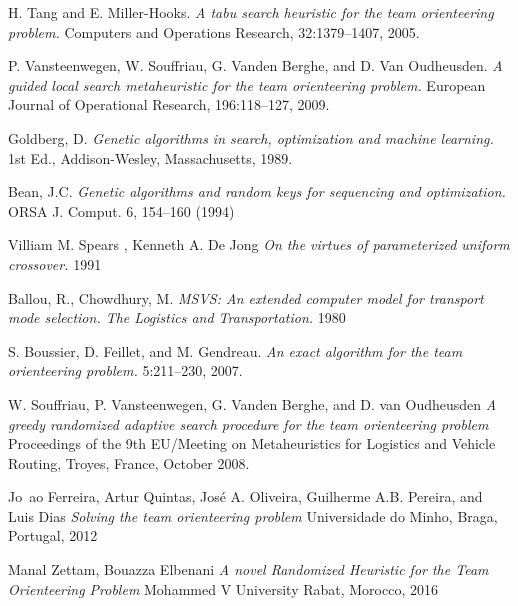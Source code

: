 \begin{thebibliography}{9}
H. Tang and E. Miller-Hooks.
\textit{A tabu search heuristic for the team orienteering problem.}
Computers and Operations Research, 32:1379–1407, 2005.

P. Vansteenwegen, W. Souffriau, G. Vanden Berghe, and D. Van Oudheusden.
\textit{A guided local search metaheuristic for the team orienteering problem.}
European Journal of Operational Research, 196:118–127, 2009.

Goldberg, D.
\textit{Genetic algorithms in search, optimization and machine learning.}
1st Ed., Addison-Wesley, Massachusetts, 1989.

Bean, J.C.
\textit{Genetic algorithms and random keys for sequencing and optimization.}
ORSA J. Comput. 6, 154–160 (1994)

Villiam M. Spears , Kenneth A. De Jong
\textit{On the virtues of parameterized uniform crossover.}
1991

Ballou, R., Chowdhury, M.
\textit{MSVS: An extended computer model for transport mode selection. The Logistics and Transportation.}
1980

S. Boussier, D. Feillet, and M. Gendreau.
\textit{An exact algorithm for the team orienteering problem.}
5:211–230, 2007.

W. Souffriau, P. Vansteenwegen, G. Vanden Berghe, and D. van Oudheusden
\textit{A greedy randomized adaptive search procedure for the team orienteering problem}
Proceedings of the 9th EU/Meeting on Metaheuristics for Logistics and Vehicle Routing, Troyes, France, October 2008.

Jo~ao Ferreira, Artur Quintas, José A. Oliveira, Guilherme A.B. Pereira, and Luis Dias
\textit{Solving the team orienteering problem}
Universidade do Minho, Braga, Portugal, 2012

Manal Zettam, Bouazza Elbenani
\textit{A novel Randomized Heuristic for the Team Orienteering Problem}
Mohammed V University Rabat, Morocco, 2016

\end{thebibliography}